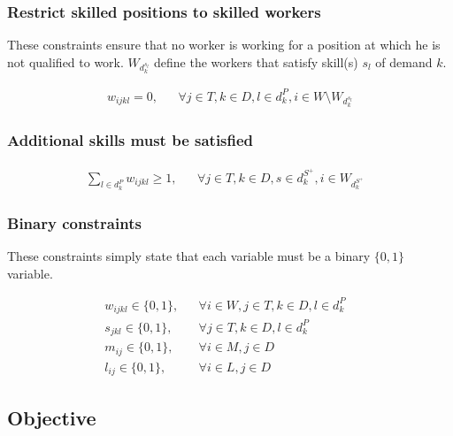 \documentclass[../../thesis.tex]{subfiles}
\begin{document}
\subsubsection{Restrict skilled positions to skilled workers}

These constraints ensure that no worker is working for a position at which he is not qualified to work.
$W_{d^{s_l}_k}$ define the workers that satisfy skill(s) $s_l$ of demand $k$. 

\begin{align}
  w_{ijkl} = 0, && \forall j \in T, k \in D, l \in d^P_k, i \in W \setminus W_{d^{s_l}_k}  \label{wc6}
\end{align}

\subsubsection{Additional skills must be satisfied}

\begin{align}
  \sum_{l \in d_k^P} w_{ijkl} \geq 1, && \forall j \in T, k \in D, s \in d^{S^+}_k, i \in W_{d^{S^+}_k}& \label{wc8}
\end{align}

\subsubsection{Binary constraints}

These constraints simply state that each variable must be a binary $\{ 0, 1 \}$ variable.

\begin{align}
  w_{ijkl} \in \{0, 1\}, && \forall i \in W, j \in T, k \in D, l \in d^P_k &\label{binary1} \\
  s_{jkl} \in \{0, 1\}, && \forall j \in T, k \in D, l \in d^P_k& \label{binary2} \\
  m_{ij} \in \{0, 1\}, && \forall i \in M, j \in D& \label{binary3} \\ 
  l_{ij} \in \{0, 1\}, && \forall i \in L, j \in D& \label{binary4} 
\end{align}

\subsection{Objective}
\end{document}
